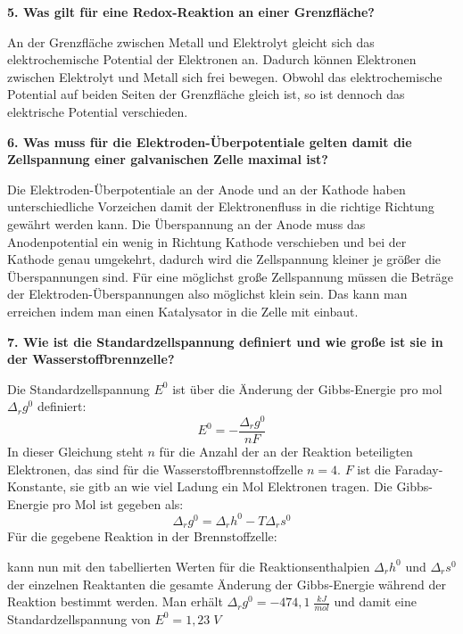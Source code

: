 \noindent\textbf{5. Was gilt für eine Redox-Reaktion an einer Grenzfläche?}\\
\begin{addmargin}[25pt]{0pt}
An der Grenzfläche zwischen Metall und Elektrolyt gleicht sich das elektrochemische Potential der Elektronen an. Dadurch können Elektronen zwischen Elektrolyt und Metall sich frei bewegen. Obwohl das elektrochemische Potential auf beiden Seiten der Grenzfläche gleich ist, so ist dennoch das elektrische Potential verschieden.\\
\end{addmargin}


\noindent\textbf{6. Was muss für die Elektroden-Überpotentiale gelten damit die Zellspannung einer galvanischen Zelle maximal ist?}\\
\begin{addmargin}[25pt]{0pt}
Die Elektroden-Überpotentiale an der Anode und an der Kathode haben unterschiedliche Vorzeichen damit der Elektronenfluss in die richtige Richtung gewährt werden kann. Die Überspannung an der Anode muss das Anodenpotential ein wenig in Richtung Kathode verschieben und bei der Kathode genau umgekehrt, dadurch wird die Zellspannung kleiner je größer die Überspannungen sind. Für eine möglichst große Zellspannung müssen die Beträge der Elektroden-Überspannungen also möglichst klein sein. Das kann man erreichen indem man einen Katalysator in die Zelle mit einbaut. \\
\end{addmargin}

\noindent\textbf{7. Wie ist die Standardzellspannung definiert und wie große ist sie in der Wasserstoffbrennzelle?}\\
\begin{addmargin}[25pt]{0pt}
Die Standardzellspannung $E^0$ ist über die Änderung der Gibbs-Energie pro mol $\Delta_rg^0$ definiert:
\begin{equation}\label{eq:def_Standardzellspannung}
    E^0 = -\frac{\Delta_rg^0}{nF}
\end{equation}
In dieser Gleichung steht $n$ für die Anzahl der an der Reaktion beteiligten Elektronen, das sind für die Wasserstoffbrennstoffzelle $n=4$. $F$ ist die Faraday-Konstante, sie gitb an wie viel Ladung ein Mol Elektronen tragen. Die Gibbs-Energie pro Mol ist gegeben als:
\begin{equation}\label{eq:gibbs_Brennstoffzelle}
    \Delta_rg^0 = \Delta_rh^0 - T\Delta_rs^0
\end{equation}
Für die gegebene Reaktion in der Brennstoffzelle:
\begin{center}
    \begin{large}
    \end{large}
\end{center}
kann nun mit den tabellierten Werten für die Reaktionsenthalpien $\Delta_rh^0$ und $\Delta_rs^0$ der einzelnen Reaktanten die gesamte Änderung der Gibbs-Energie während der Reaktion bestimmt werden. Man erhält $\Delta_rg^0 = -474,1 \;\frac{\si{kJ}}{\si{mol}}$ und damit eine Standardzellspannung von $E^0 = 1,23 \;\si{V}$\\
\end{addmargin}

